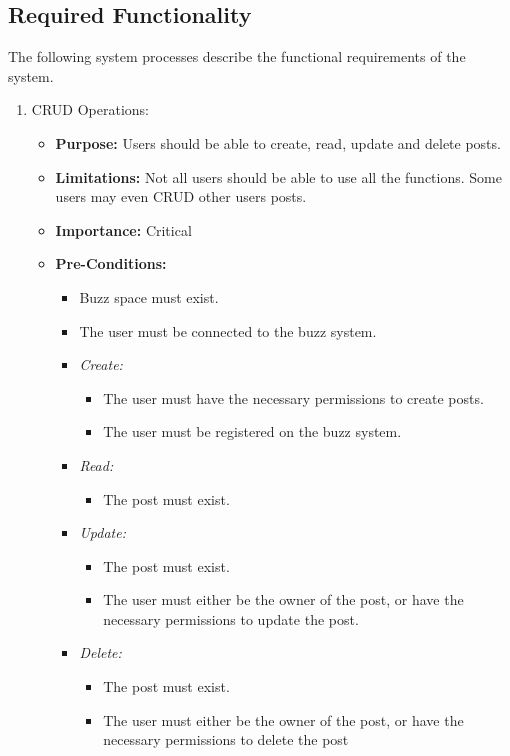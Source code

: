 \documentclass[11pt]{article}
\begin{document}
\subsection{Required Functionality}
The following system processes describe the functional requirements of the system.
\begin{enumerate}

\item CRUD Operations:
	\begin{itemize}
	\item \textbf{Purpose:}
	Users should be able to create, read, update and delete posts.
	\newline
	\item \textbf{Limitations:} Not all users should be able to use all the functions. Some users may even CRUD other users posts.
	\item \textbf{Importance: } Critical
	\item \textbf{Pre-Conditions: }
		\begin{itemize}
		\item Buzz space must exist.
		\item The user must be connected to the buzz system.\item 	
		
		\textit{Create: }
			\begin{itemize}
    			\item The user must have the necessary permissions to create posts.
    			\item The user must be registered on the buzz system.
  			\end{itemize}
  			
		\item \textit{Read: }
			\begin{itemize}
			\item The post must exist.
			\end{itemize}
	
		\item \textit{Update: }
			\begin{itemize}
			\item The post must exist.
			\item The user must either be the owner of the post, or have the necessary permissions to update the post.
			\end{itemize}

		\item \textit{Delete: }
			\begin{itemize}
			\item The post must exist.
			\item The user must either be the owner of the post, or have the necessary permissions to delete the post
			\end{itemize}  			
  			

\end{itemize}
\end{itemize}
\end{enumerate}
\end{document}
